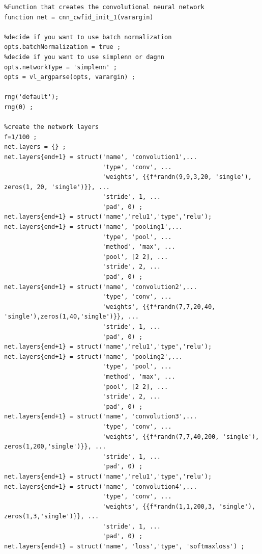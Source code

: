\documentclass[]{report}
\begin{document}
\begin{lstlisting}
%Function that creates the convolutional neural network
function net = cnn_cwfid_init_1(varargin)

%decide if you want to use batch normalization
opts.batchNormalization = true ;
%decide if you want to use simplenn or dagnn
opts.networkType = 'simplenn' ;
opts = vl_argparse(opts, varargin) ;

rng('default');
rng(0) ;

%create the network layers
f=1/100 ;
net.layers = {} ;
net.layers{end+1} = struct('name', 'convolution1',...
                           'type', 'conv', ...
                           'weights', {{f*randn(9,9,3,20, 'single'), zeros(1, 20, 'single')}}, ...
                           'stride', 1, ...
                           'pad', 0) ;
net.layers{end+1} = struct('name','relu1','type','relu');                         
net.layers{end+1} = struct('name', 'pooling1',...
                           'type', 'pool', ...
                           'method', 'max', ...
                           'pool', [2 2], ...
                           'stride', 2, ...
                           'pad', 0) ;
net.layers{end+1} = struct('name', 'convolution2',...
                           'type', 'conv', ...
                           'weights', {{f*randn(7,7,20,40, 'single'),zeros(1,40,'single')}}, ...
                           'stride', 1, ...
                           'pad', 0) ;
net.layers{end+1} = struct('name','relu1','type','relu');                           
net.layers{end+1} = struct('name', 'pooling2',...
                           'type', 'pool', ...
                           'method', 'max', ...
                           'pool', [2 2], ...
                           'stride', 2, ...
                           'pad', 0) ;                          
net.layers{end+1} = struct('name', 'convolution3',...
                           'type', 'conv', ...
                           'weights', {{f*randn(7,7,40,200, 'single'),  zeros(1,200,'single')}}, ...
                           'stride', 1, ...
                           'pad', 0) ;
net.layers{end+1} = struct('name','relu1','type','relu');                            
net.layers{end+1} = struct('name', 'convolution4',...
                           'type', 'conv', ...
                           'weights', {{f*randn(1,1,200,3, 'single'), zeros(1,3,'single')}}, ...
                           'stride', 1, ...
                           'pad', 0) ;
net.layers{end+1} = struct('name', 'loss','type', 'softmaxloss') ;


\end{lstlisting}
\end{document}
